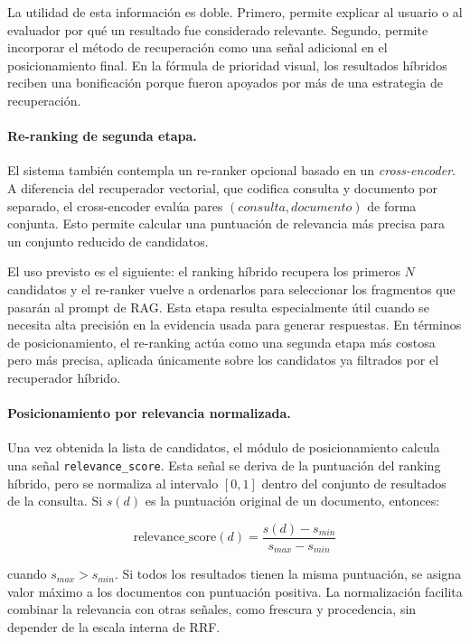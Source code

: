 \documentclass[11pt]{article}
\begin{document}
La utilidad de esta información es doble. Primero, permite explicar al usuario o al evaluador por
qué un resultado fue considerado relevante. Segundo, permite incorporar el método de recuperación
como una señal adicional en el posicionamiento final. En la fórmula de prioridad visual, los
resultados híbridos reciben una bonificación porque fueron apoyados por más de una estrategia de
recuperación.

\paragraph{Re-ranking de segunda etapa.}
El sistema también contempla un re-ranker opcional basado en un \emph{cross-encoder}. A diferencia
del recuperador vectorial, que codifica consulta y documento por separado, el cross-encoder evalúa
pares \((consulta, documento)\) de forma conjunta. Esto permite calcular una puntuación de
relevancia más precisa para un conjunto reducido de candidatos.

El uso previsto es el siguiente: el ranking híbrido recupera los primeros \(N\) candidatos y el
re-ranker vuelve a ordenarlos para seleccionar los fragmentos que pasarán al prompt de RAG. Esta
etapa resulta especialmente útil cuando se necesita alta precisión en la evidencia usada para
generar respuestas. En términos de posicionamiento, el re-ranking actúa como una segunda etapa
más costosa pero más precisa, aplicada únicamente sobre los candidatos ya filtrados por el
recuperador híbrido.

\paragraph{Posicionamiento por relevancia normalizada.}
Una vez obtenida la lista de candidatos, el módulo de posicionamiento calcula una señal
\texttt{relevance\_score}. Esta señal se deriva de la puntuación del ranking híbrido, pero se
normaliza al intervalo \([0,1]\) dentro del conjunto de resultados de la consulta. Si
\(s(d)\) es la puntuación original de un documento, entonces:

\[
\mathrm{relevance\_score}(d) =
\frac{s(d)-s_{min}}{s_{max}-s_{min}}
\]

cuando \(s_{max} > s_{min}\). Si todos los resultados tienen la misma puntuación, se asigna valor
máximo a los documentos con puntuación positiva. La normalización facilita combinar la relevancia
con otras señales, como frescura y procedencia, sin depender de la escala interna de RRF.
\end{document}
